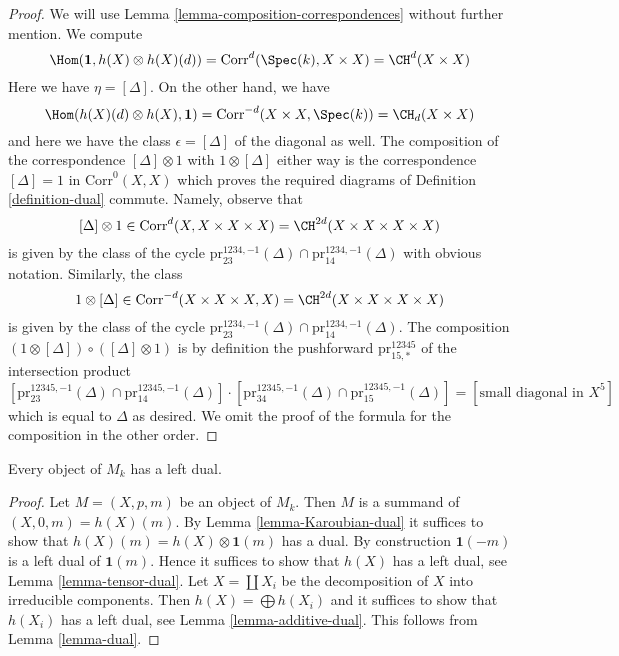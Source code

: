 \begin{proof}
We will use Lemma \ref{lemma-composition-correspondences}
without further mention. We compute
$$
\Hom(\mathbf{1}, h(X) \otimes h(X)(d)) =
\text{Corr}^d(\Spec(k), X \times X) = \CH^d(X \times X)
$$
Here we have $\eta = [\Delta]$. On the other hand, we have
$$
\Hom(h(X)(d) \otimes h(X), \mathbf{1}) =
\text{Corr}^{-d}(X \times X, \Spec(k)) = \CH_d(X \times X)
$$
and here we have the class $\epsilon = [\Delta]$
of the diagonal as well. The composition of the correspondence
$[\Delta] \otimes 1$ with $1 \otimes [\Delta]$ either way
is the correspondence $[\Delta] = 1$ in $\text{Corr}^0(X, X)$ which proves
the required diagrams of Definition \ref{definition-dual} commute.
Namely, observe that
$$
[\Delta] \otimes 1 \in \text{Corr}^d(X, X \times X \times X) =
\CH^{2d}(X \times X \times X \times X)
$$
is given by the class of the cycle
$\text{pr}^{1234, -1}_{23}(\Delta) \cap \text{pr}^{1234, -1}_{14}(\Delta)$ with
obvious notation. Similarly, the class
$$
1 \otimes [\Delta] \in \text{Corr}^{-d}(X \times X \times X, X) =
\CH^{2d}(X \times X \times X \times X)
$$
is given by the class of the cycle
$\text{pr}^{1234, -1}_{23}(\Delta) \cap \text{pr}^{1234, -1}_{14}(\Delta)$.
The composition $(1 \otimes [\Delta]) \circ ([\Delta] \otimes 1)$
is by definition the pushforward $\text{pr}^{12345}_{15, *}$
of the intersection product
$$
[\text{pr}^{12345, -1}_{23}(\Delta) \cap \text{pr}^{12345, -1}_{14}(\Delta)]
\cdot
[\text{pr}^{12345, -1}_{34}(\Delta) \cap \text{pr}^{12345, -1}_{15}(\Delta)]
=
[\text{small diagonal in } X^5]
$$
which is equal to $\Delta$ as desired. We omit the proof of the formula
for the composition in the other order.
\end{proof}

\begin{lemma}
\label{lemma-dual-general}
Every object of $M_k$ has a left dual.
\end{lemma}

\begin{proof}
Let $M = (X, p, m)$ be an object of $M_k$. Then $M$ is a summand of
$(X, 0, m) = h(X)(m)$.
By Lemma \ref{lemma-Karoubian-dual} it suffices to show that
$h(X)(m) = h(X) \otimes \mathbf{1}(m)$ has a dual.
By construction $\mathbf{1}(-m)$ is a left dual of $\mathbf{1}(m)$.
Hence it suffices to show that $h(X)$ has a left dual, see
Lemma \ref{lemma-tensor-dual}.
Let $X = \coprod X_i$ be the decomposition of $X$ into
irreducible components. Then $h(X) = \bigoplus h(X_i)$
and it suffices to show that $h(X_i)$ has a left dual, see
Lemma \ref{lemma-additive-dual}.
This follows from Lemma \ref{lemma-dual}.
\end{proof}






